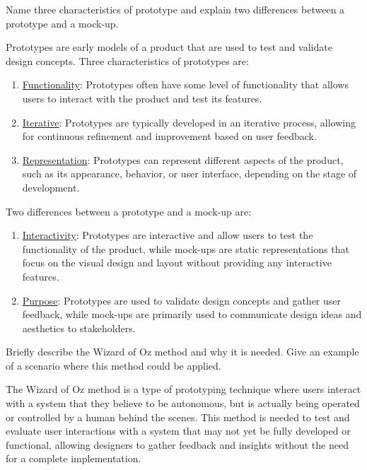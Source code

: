 \begin{ejercicio}
    Name three characteristics of prototype and explain two differences between a prototype and a mock-up.

    Prototypes are early models of a product that are used to test and validate design concepts. Three characteristics of prototypes are:
    \begin{enumerate}
        \item \ul{Functionality}: Prototypes often have some level of functionality that allows users to interact with the product and test its features.
        \item \ul{Iterative}: Prototypes are typically developed in an iterative process, allowing for continuous refinement and improvement based on user feedback.
        \item \ul{Representation}: Prototypes can represent different aspects of the product, such as its appearance, behavior, or user interface, depending on the stage of development.
    \end{enumerate}

    Two differences between a prototype and a mock-up are:
    \begin{enumerate}
        \item \ul{Interactivity}: Prototypes are interactive and allow users to test the functionality of the product, while mock-ups are static representations that focus on the visual design and layout without providing any interactive features.
        \item \ul{Purpose}: Prototypes are used to validate design concepts and gather user feedback, while mock-ups are primarily used to communicate design ideas and aesthetics to stakeholders.
    \end{enumerate}
\end{ejercicio}

\begin{ejercicio}
    Briefly describe the Wizard of Oz method and why it is needed. Give an example of a scenario where this method could be applied.

    The Wizard of Oz method is a type of prototyping technique where users interact with a system that they believe to be autonomous, but is actually being operated or controlled by a human behind the scenes. This method is needed to test and evaluate user interactions with a system that may not yet be fully developed or functional, allowing designers to gather feedback and insights without the need for a complete implementation.
\end{ejercicio}

